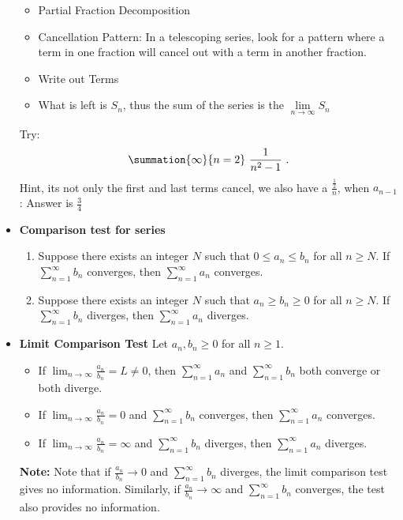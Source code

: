 \documentclass{report}
\begin{document}
\begin{itemize}
        \begin{itemize}
            \item Partial Fraction Decomposition
            \item Cancellation Pattern: In a telescoping series, look for a pattern where a term in one fraction will cancel out with a term in another fraction.
            \item Write out Terms
            \item What is left is $S_{n}$, thus the sum of the series is the $\lim\limits_{n \to \infty}{S_{n}} $
        \end{itemize}
        Try: 
        \begin{align*}
            \summation{\infty}{n=2}\ \frac{1}{n^{2}-1}\ 
        .\end{align*}
        Hint, its not only the first and last terms cancel, we also have a $\frac{\frac{1}{2}}{n}$, when $a_{n-1}$: Answer is $\frac{3}{4}$
        \pagebreak 
    \item \textbf{Comparison test for series}
        \begin{enumerate}
            \item Suppose there exists an integer \( N \) such that \( 0 \leq a_n \leq b_n \) for all \( n \geq N \). If \( \sum_{n=1}^{\infty} b_n \) converges, then \( \sum_{n=1}^{\infty} a_n \) converges. 
            \item  Suppose there exists an integer \( N \) such that \( a_n \geq b_n \geq 0 \) for all \( n \geq N \). If \( \sum_{n=1}^{\infty} b_n \) diverges, then \( \sum_{n=1}^{\infty} a_n \) diverges.
        \end{enumerate}
    \item \textbf{Limit Comparison Test}
        Let \( a_n, b_n \geq 0 \) for all \( n \geq 1 \).
        \begin{itemize}
            \item If \( \lim_{n \to \infty} \frac{a_n}{b_n} = L \neq 0 \), then \( \sum_{n=1}^{\infty} a_n \) and \( \sum_{n=1}^{\infty} b_n \) both converge or both diverge.
            \item If \( \lim_{n \to \infty} \frac{a_n}{b_n} = 0 \) and \( \sum_{n=1}^{\infty} b_n \) converges, then \( \sum_{n=1}^{\infty} a_n \) converges.
            \item If \( \lim_{n \to \infty} \frac{a_n}{b_n} = \infty \) and \( \sum_{n=1}^{\infty} b_n \) diverges, then \( \sum_{n=1}^{\infty} a_n \) diverges.
        \end{itemize}
        \textbf{Note:} Note that if $\frac{a_n}{b_n} \to 0$ and $\sum_{n=1}^{\infty} b_n$ diverges, the limit comparison test gives no information. Similarly, if $\frac{a_n}{b_n} \to \infty$ and $\sum_{n=1}^{\infty} b_n$ converges, the test also provides no information. 

\end{itemize}
\end{document}
